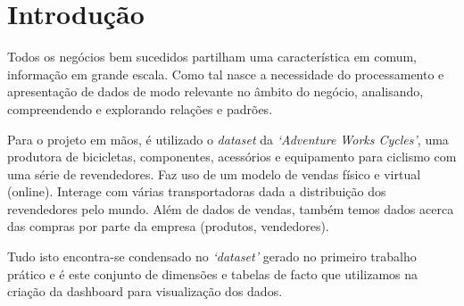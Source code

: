 \section*{Introdução}

Todos os negócios bem sucedidos partilham uma característica em comum, informação em grande escala.
Como tal nasce a necessidade do processamento e apresentação de dados de modo relevante no âmbito do negócio, analisando, compreendendo e explorando relações e padrões.

Para o projeto em mãos, é utilizado o \textit{dataset} da \textit{`Adventure Works Cycles'}, uma produtora de bicicletas, componentes, acessórios e equipamento para ciclismo com uma série de revendedores. Faz uso de um modelo de vendas físico e virtual (online). Interage com várias transportadoras dada a distribuição dos revendedores pelo mundo.
Além de dados de vendas, também temos dados acerca das compras por parte da empresa (produtos, vendedores). 

Tudo isto encontra-se condensado no \textit{`dataset'} gerado no primeiro trabalho prático e é este conjunto de dimensões e tabelas de facto que utilizamos na criação da dashboard para visualização dos dados.